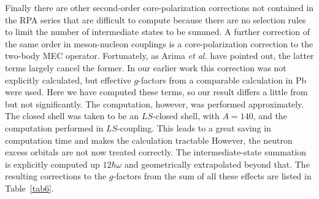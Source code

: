 \documentclass[aps,twocolumn,superscriptaddress,prc,showpacs]{revtex4}
\begin{document}
Finally there are other second-order core-polarization corrections not
contained in the RPA series that are difficult to compute because there
are
no selection rules to limit the number of intermediate states to be
summed.  A further correction of the same order in meson-nucleon
couplings
is a core-polarization correction to the two-body MEC operator.
Fortunately, as Arima {\it et al.} \cite{AH79,HAS80} have
pointed out,
the latter terms largely cancel the former.
In our earlier work \cite{St97}
this correction was not explicitly calculated, but effective $  g
$-factors
from a comparable calculation in Pb were used.  Here we have computed
these terms, so our result differs a little from \cite{St97} but not
significantly.  The computation, however, was performed approximately.
The closed shell was taken to be an $LS$-closed shell, with $A=140$,   
and the computation performed in $LS$-coupling.  This leads to a great   
saving in computation time and makes the calculation tractable
However, the neutron excess orbitals are not now treated correctly.
The intermediate-state summation is explicitly computed up
$  12 \hbar \omega  $ and geometrically extrapolated beyond that.
The resulting corrections to the $  g  $-factors from the sum of all
these effects are listed in Table~\ref{tab6}. 
\end{document}
